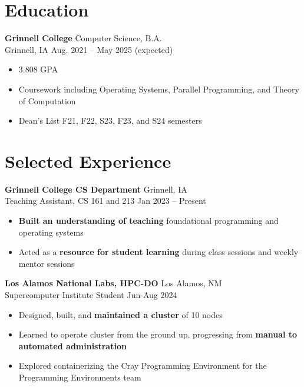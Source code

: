 \documentclass[12pt]{article}
\newcommand{\entry}[4]{{{\textbf{#1}}} \hfill #3 \\ #2 \hfill #4}
\begin{document}
\noindent %
\begin{minipage}[t]{0.63\textwidth}

  \section{Education}
  \entry{Grinnell College}{Grinnell, IA}{Computer Science, B.A.}{Aug. 2021 -- May 2025 (expected)}
  \begin{itemize}[noitemsep,rightmargin=0mm,topsep=0pt,leftmargin=.75cm]
    \item 3.808 GPA
    \item Coursework including Operating Systems, Parallel Programming, and Theory of Computation
    \item Dean's List F21, F22, S23, F23, and S24 semesters
  \end{itemize}
  \vspace{-15pt} %

  \section{Selected Experience}
  \entry{Grinnell College CS Department}{Teaching Assistant, CS 161 and 213}{Grinnell, IA}{Jan 2023 -- Present}
  \begin{itemize}[noitemsep,rightmargin=0mm,topsep=0pt,leftmargin=.75cm]
    \item {\bf Built an understanding of teaching} foundational programming and operating systems
    \item Acted as a {\bf resource for student learning} during class sessions and weekly mentor sessions
  \end{itemize}

  \medskip

  \entry{Los Alamos National Labs, HPC-DO}{Supercomputer Institute Student}{Los Alamos, NM}{Jun-Aug 2024}
  \begin{itemize}[noitemsep,rightmargin=0mm,topsep=0pt,leftmargin=.75cm]
    \item Designed, built, and {\bf maintained a cluster} of 10 nodes
    \item Learned to operate cluster from the ground up, progressing from {\bf manual to automated administration}
    \item Explored containerizing the Cray Programming Environment for the Programming Environments team
  \end{itemize}


\end{minipage}
\end{document}
